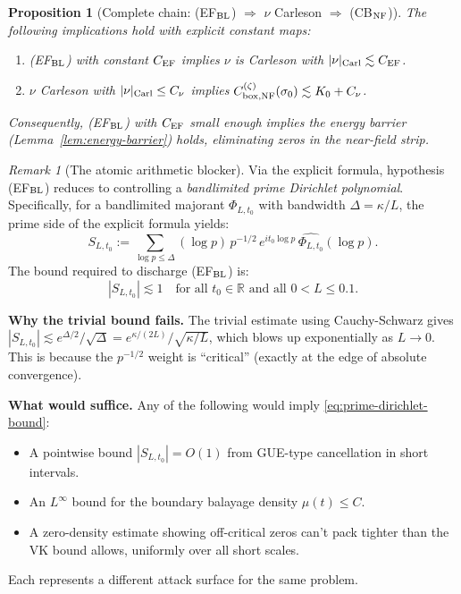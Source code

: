 \documentclass[11pt]{article}
\newtheorem{proposition}[theorem]{Proposition}
\theoremstyle{definition}
\theoremstyle{remark}
\newtheorem{remark}[theorem]{Remark}
\theoremstyle{definition}
\begin{document}
\begin{proposition}[Complete chain: \textup{(EF$_{\rm BL}$)} $\Rightarrow$ $\nu$ Carleson $\Rightarrow$ \textup{(CB$_{\rm NF}$)}]\label{prop:complete-chain}
The following implications hold with explicit constant maps:
\begin{enumerate}
\item \textup{(EF$_{\rm BL}$)} with constant $C_{\rm EF}$ implies $\nu$ is Carleson with $|\nu|_{\rm Carl} \lesssim C_{\rm EF}$.
\item $\nu$ Carleson with $|\nu|_{\rm Carl} \le C_\nu$ implies $C_{{\rm box},{\rm NF}}^{(\zeta)}(\sigma_0) \lesssim K_0 + C_\nu$.
\end{enumerate}
Consequently, \textup{(EF$_{\rm BL}$)} with $C_{\rm EF}$ small enough implies the energy barrier (Lemma~\ref{lem:energy-barrier}) holds, eliminating zeros in the near-field strip.
\end{proposition}

\begin{remark}[The atomic arithmetic blocker]\label{rem:arithmetic-blocker}
Via the explicit formula, hypothesis \textup{(EF$_{\rm BL}$)} reduces to controlling a \emph{bandlimited prime Dirichlet polynomial}. Specifically, for a bandlimited majorant $\Phi_{L,t_0}$ with bandwidth $\Delta = \kappa/L$, the prime side of the explicit formula yields:
\[
  S_{L,t_0} := \sum_{\log p \le \Delta} (\log p)\, p^{-1/2}\, e^{it_0 \log p}\, \widehat{\Phi_{L,t_0}}(\log p).
\]
The bound required to discharge \textup{(EF$_{\rm BL}$)} is:
\begin{equation}\label{eq:prime-dirichlet-bound}
  \boxed{|S_{L,t_0}| \lesssim 1 \quad \text{for all } t_0 \in \mathbb{R} \text{ and all } 0 < L \le 0.1.}
\end{equation}

\textbf{Why the trivial bound fails.}
The trivial estimate using Cauchy-Schwarz gives $|S_{L,t_0}| \lesssim e^{\Delta/2} / \sqrt{\Delta} = e^{\kappa/(2L)} / \sqrt{\kappa/L}$, which blows up exponentially as $L \to 0$. This is because the $p^{-1/2}$ weight is ``critical'' (exactly at the edge of absolute convergence).

\textbf{What would suffice.}
Any of the following would imply \eqref{eq:prime-dirichlet-bound}:
\begin{itemize}
\item A pointwise bound $|S_{L,t_0}| = O(1)$ from GUE-type cancellation in short intervals.
\item An $L^\infty$ bound for the boundary balayage density $\mu(t) \le C$.
\item A zero-density estimate showing off-critical zeros can't pack tighter than the VK bound allows, uniformly over all short scales.
\end{itemize}
Each represents a different attack surface for the same problem.
\end{remark}
\end{document}
